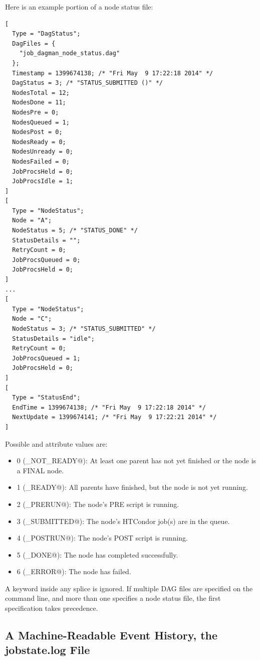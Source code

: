 Here is an example portion of a node status file:

\begin{verbatim}
[
  Type = "DagStatus";
  DagFiles = {
    "job_dagman_node_status.dag"
  };
  Timestamp = 1399674138; /* "Fri May  9 17:22:18 2014" */
  DagStatus = 3; /* "STATUS_SUBMITTED ()" */
  NodesTotal = 12;
  NodesDone = 11;
  NodesPre = 0;
  NodesQueued = 1;
  NodesPost = 0;
  NodesReady = 0;
  NodesUnready = 0;
  NodesFailed = 0;
  JobProcsHeld = 0;
  JobProcsIdle = 1;
]
[
  Type = "NodeStatus";
  Node = "A";
  NodeStatus = 5; /* "STATUS_DONE" */
  StatusDetails = "";
  RetryCount = 0;
  JobProcsQueued = 0;
  JobProcsHeld = 0;
]
...
[
  Type = "NodeStatus";
  Node = "C";
  NodeStatus = 3; /* "STATUS_SUBMITTED" */
  StatusDetails = "idle";
  RetryCount = 0;
  JobProcsQueued = 1;
  JobProcsHeld = 0;
]
[
  Type = "StatusEnd";
  EndTime = 1399674138; /* "Fri May  9 17:22:18 2014" */
  NextUpdate = 1399674141; /* "Fri May  9 17:22:21 2014" */
]
\end{verbatim}

Possible  and  attribute values are:

\begin{itemize}
\item 0 (\verb@STATUS_NOT_READY@): At least one parent has not yet finished
or the node is a FINAL node.
\item 1 (\verb@STATUS_READY@): All parents have finished, but the node is not
yet running.
\item 2 (\verb@STATUS_PRERUN@): The node's PRE script is running.
\item 3 (\verb@STATUS_SUBMITTED@): The node's HTCondor job(s) are in 
  the queue.
\item 4 (\verb@STATUS_POSTRUN@): The node's POST script is running.
\item 5 (\verb@STATUS_DONE@): The node has completed successfully.
\item 6 (\verb@STATUS_ERROR@): The node has failed.
\end{itemize}

A  keyword inside any splice is ignored.
If multiple DAG files are specified on the  command line,
and more than one specifies a node status file,
the first specification takes precedence.

\subsection{\label{sec:DAGJobstateLog}A Machine-Readable Event History, the jobstate.log File}


